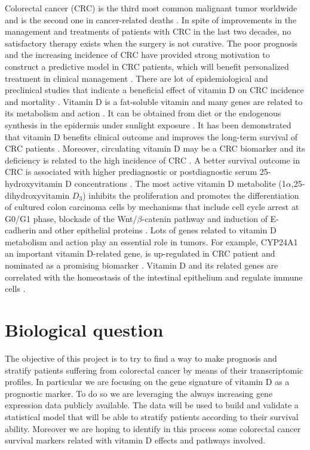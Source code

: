 \documentclass[fleqn,10pt]{SelfArx} %
\begin{document}
Colorectal cancer (CRC) is the third most common malignant tumor worldwide and is the second one in cancer-related deaths \cite{Ferlay2018-pg}. In spite of improvements in the management and treatments of patients with CRC in the last two decades, no satisfactory therapy exists when the surgery is not curative. The poor prognosis and the increasing incidence of CRC have provided strong motivation to construct a predictive model in CRC patients, which will benefit personalized treatment in clinical management \cite{Bu2021-xn}.
There are lot of epidemiological and preclinical studies that indicate a beneficial effect of vitamin D on CRC incidence and mortality \cite{Pereira2012-pf} \cite{Giovannucci2013-ss}.
Vitamin D is a fat-soluble vitamin and many genes are related to its metabolism and action \cite{Fedirko2019-ai}. It can be obtained from diet or the endogenous synthesis in the epidermis under sunlight exposure \cite{Saraff2016-dr}. It has been demonstrated that vitamin D benefits clinical outcome and improves the long-term survival of CRC patients \cite{Xu2021-vb}. Moreover, circulating vitamin D may be a CRC biomarker and its deficiency is related to the high incidence of CRC \cite{Meeker2016-tr}.
A better survival outcome in CRC is associated with higher prediagnostic or postdiagnostic serum 25-hydroxyvitamin D concentrations \cite{Zgaga2014-dd}. The most active vitamin D metabolite (1$\alpha$,25-dihydroxyvitamin $D_3$) inhibits the proliferation and promotes the differentiation of cultured colon carcinoma cells by mechanisms that include cell cycle arrest at G0/G1 phase, blockade of the Wnt/$\beta$-catenin pathway and induction of E-cadherin and other epithelial proteins \cite{Pereira2012-pf} \cite{Feldman2014-mh} \cite{Palmer2001-bh}.
Lots of genes related to vitamin D metabolism and action play an essential role in tumors. For example, CYP24A1 an important vitamin D-related gene, is up-regulated in CRC patient and nominated as a promising biomarker \cite{Sadeghi2020-ci}. Vitamin D and its related genes are correlated with the homeostasis of the intestinal epithelium and regulate immune cells \cite{Martinez-Romero2018-gp}.


\section{Biological question}
The objective of this project is to try to find a way to make prognosis and stratify patients suffering from colorectal cancer by means of their transcriptomic profiles.
In particular we are focusing on the gene signature of vitamin D as a prognostic marker.
To do so we are leveraging the always increasing gene expression data publicly available.
The data will be used to build and validate a statistical model that will be able to stratify patients according to their survival ability.
Moreover we are hoping to identify in this process some colorectal cancer survival markers related with vitamin D effects and pathways involved.
\end{document}
